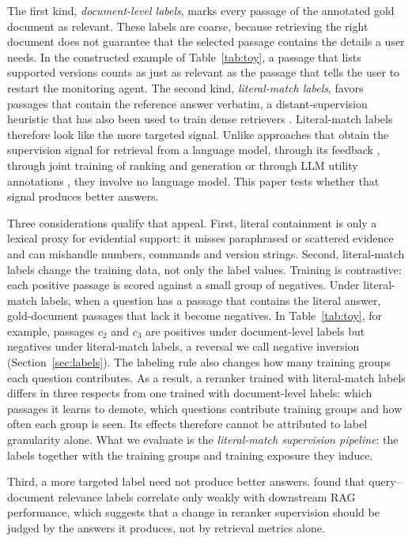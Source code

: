The first kind, \emph{document-level labels}, marks every passage of the annotated gold document as relevant. These labels are coarse, because retrieving the right document does not guarantee that the selected passage contains the details a user needs. In the constructed example of Table~\ref{tab:toy}, a passage that lists supported versions counts as just as relevant as the passage that tells the user to restart the monitoring agent. The second kind, \emph{literal-match labels}, favors passages that contain the reference answer verbatim, a distant-supervision heuristic that has also been used to train dense retrievers \citep{karpukhin2020}. Literal-match labels therefore look like the more targeted signal. Unlike approaches that obtain the supervision signal for retrieval from a language model, through its feedback \citep{shi2024}, through joint training of ranking and generation \citep{yu2024} or through LLM utility annotations \citep{zhang2025utility}, they involve no language model. This paper tests whether that signal produces better answers.

Three considerations qualify that appeal. First, literal containment is only a lexical proxy for evidential support: it misses paraphrased or scattered evidence and can mishandle numbers, commands and version strings. Second, literal-match labels change the training data, not only the label values. Training is contrastive: each positive passage is scored against a small group of negatives. Under literal-match labels, when a question has a passage that contains the literal answer, gold-document passages that lack it become negatives. In Table~\ref{tab:toy}, for example, passages $c_2$ and $c_3$ are positives under document-level labels but negatives under literal-match labels, a reversal we call negative inversion (Section~\ref{sec:labels}). The labeling rule also changes how many training groups each question contributes. As a result, a reranker trained with literal-match labels differs in three respects from one trained with document-level labels: which passages it learns to demote, which questions contribute training groups and how often each group is seen. Its effects therefore cannot be attributed to label granularity alone. What we evaluate is the \emph{literal-match supervision pipeline}: the labels together with the training groups and training exposure they induce.

Third, a more targeted label need not produce better answers. \citet{salemi2024} found that query--document relevance labels correlate only weakly with downstream RAG performance, which suggests that a change in reranker supervision should be judged by the answers it produces, not by retrieval metrics alone.

